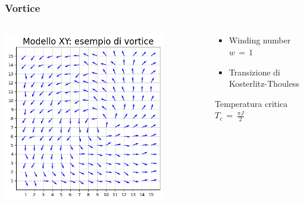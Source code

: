 \begin{frame}
    \frametitle{Vortice}
    \framesubtitle{}

    \begin{columns}
        \begin{column}{0.5\textwidth}
            \centering
            \includegraphics[width=0.8\textwidth]{Immagini/simXY/conf_vortice.png}
        \end{column}
    
        \begin{column}{0.5\textwidth}
            \begin{itemize}[itemsep=0.5em, label=$\diamond$]
                \item Winding number $w\,=\,1$
                \item Transizione di Kosterlitz-Thouless
            \end{itemize}
        \vspace{12pt}

        \begin{block}{Temperatura critica}
            \centering
            $T_c\,=\,\frac{\pi J}{2} $
        \end{block}
        \end{column}
    \end{columns}

\end{frame}



